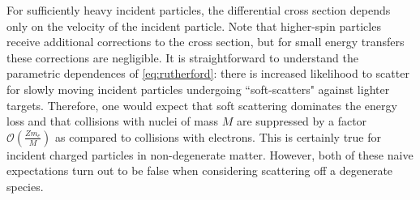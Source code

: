 \documentclass[twocolumn,showpacs,preprintnumbers,amsmath,amssymb,prl]{revtex4}
\newcommand{\OO}{\mathcal{O}}
\def\r{\right)}
\def\l{\left(}
\begin{document}
For sufficiently heavy incident particles, the differential cross section depends only on the velocity of the incident particle. Note that higher-spin particles receive additional corrections to the cross section, but for small energy transfers these corrections are negligible. It is straightforward to understand the parametric dependences of \eqref{eq:rutherford}: there is increased likelihood to scatter for slowly moving incident particles undergoing ``soft-scatters" against lighter targets. Therefore, one would expect that soft scattering dominates the energy loss and that collisions with nuclei of mass $M$ are suppressed by a factor $\OO\l\frac{Z m_e}{M}\r$ as compared to collisions with electrons. This is certainly true for incident charged particles in non-degenerate matter. However, both of these naive expectations turn out to be false when considering scattering off a degenerate species.
\end{document}
